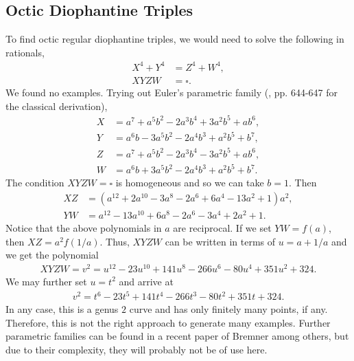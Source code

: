 \documentclass{amsart}
\begin{document}

\subsection{Octic Diophantine Triples}
To find octic regular diophantine triples, we would need to solve the following in rationals,
\begin{align} \label{power-sum quartic} 
    X^4+Y^4 &= Z^4+W^4,\\
    XYZW &= \square.
\end{align}
We found no examples. Trying out Euler's parametric family (\cite{dickson1920history2}, pp. 644-647 for the classical derivation),
\begin{align*}
X &= a^7 + a^5b^2 - 2a^3b^4 + 3a^2b^5 + ab^6, \\
Y &= a^6b - 3a^5b^2 - 2a^4b^3 + a^2b^5 + b^7, \\
Z &= a^7 + a^5b^2 - 2a^3b^4 - 3a^2b^5 + ab^6, \\
W &= a^6b + 3a^5b^2 - 2a^4b^3 + a^2b^5 + b^7.
\end{align*}
The condition $XYZW = \square$ is homogeneous and so we can take $b=1$. Then
\begin{align*}
    XZ &= (a^{12} + 2a^{10} - 3a^8 - 2a^6 + 6a^4 - 13a^2 + 1)a^2, \\
    YW &= a^{12} - 13a^{10} + 6a^8 - 2a^6 - 3a^4 + 2a^2 + 1.
\end{align*}
Notice that the above polynomials in $a$ are reciprocal. If we set $YW=f(a)$, then $XZ=a^2f(1/a)$. Thus, $XYZW$ can be written in terms of $u = a+1/a$ and we get the polynomial
\begin{align*}
    XYZW = v^2 = u^{12} - 23u^{10} + 141u^8 - 266u^6 - 80u^4 + 351u^2 + 324.
\end{align*}
We may further set $u=t^2$ and arrive at
\begin{align*}
    v^2 = t^6 - 23t^5 + 141t^4 - 266t^3 - 80t^2 + 351t + 324.
\end{align*}
In any case, this is a genus $2$ curve and has only finitely many points, if any. Therefore, this is not the right approach to generate many examples.
Further parametric families can be found in a recent paper of Bremner \cite{Bremner_4th_powers} among others, but due to their complexity, they will probably not be of use here.
\end{document}
